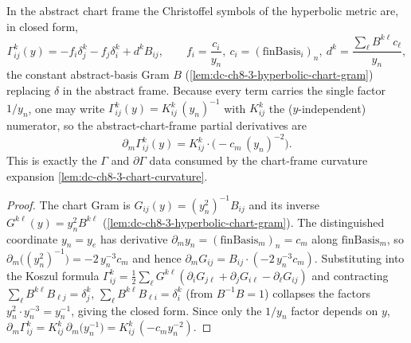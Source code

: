 \begin{lemma}
  \label{lem:dc-ch8-3-hyperbolic-christoffel}
  \leanok
  In the abstract chart frame the Christoffel symbols of the hyperbolic metric are,
  in closed form,
  $$\Gamma^k_{ij}(y)=-f_i\delta^k_j-f_j\delta^k_i+d^k B_{ij},\qquad
    f_i=\frac{c_i}{y_n},\ c_i=(\text{finBasis}_i)_n,\ d^k=\frac{\sum_\ell B^{k\ell}c_\ell}{y_n},$$
  the constant abstract-basis Gram $B$ (\cref{lem:dc-ch8-3-hyperbolic-chart-gram})
  replacing $\delta$ in the abstract frame.
  Because every term carries the single factor $1/y_n$, one may write
  $\Gamma^k_{ij}(y)=K^k_{ij}\,(y_n)^{-1}$ with $K^k_{ij}$ the ($y$-independent)
  numerator, so the abstract-chart-frame partial derivatives are
  $$\partial_m\Gamma^k_{ij}(y)=K^k_{ij}\cdot\bigl(-c_m\,(y_n)^{-2}\bigr).$$
  This is exactly the $\Gamma$ and $\partial\Gamma$ data consumed by the chart-frame
  curvature expansion \cref{lem:dc-ch8-3-chart-curvature}.
\end{lemma}
\begin{proof}
  \leanok
\sketch
  The chart Gram is $G_{ij}(y)=(y_n^2)^{-1}B_{ij}$ and its inverse
  $G^{k\ell}(y)=y_n^2 B^{k\ell}$ (\cref{lem:dc-ch8-3-hyperbolic-chart-gram}). The
  distinguished coordinate $y_n=y_e$ has derivative
  $\partial_m y_n=(\text{finBasis}_m)_n=c_m$ along $\text{finBasis}_m$, so
  $\partial_m\bigl((y_n^2)^{-1}\bigr)=-2\,y_n^{-3}c_m$ and hence
  $\partial_m G_{ij}=B_{ij}\cdot(-2\,y_n^{-3}c_m)$. Substituting into the Koszul
  formula
  $\Gamma^k_{ij}=\tfrac12\sum_\ell G^{k\ell}(\partial_iG_{j\ell}+\partial_jG_{i\ell}-\partial_\ell G_{ij})$
  and contracting $\sum_\ell B^{k\ell}B_{\ell j}=\delta^k_j$,
  $\sum_\ell B^{k\ell}B_{\ell i}=\delta^k_i$ (from $B^{-1}B=1$) collapses the factors
  $y_n^2\cdot y_n^{-3}=y_n^{-1}$, giving the closed form. Since only the $1/y_n$ factor
  depends on $y$, $\partial_m\Gamma^k_{ij}=K^k_{ij}\,\partial_m\bigl(y_n^{-1}\bigr)
  =K^k_{ij}\,(-c_m y_n^{-2})$.
\end{proof}

